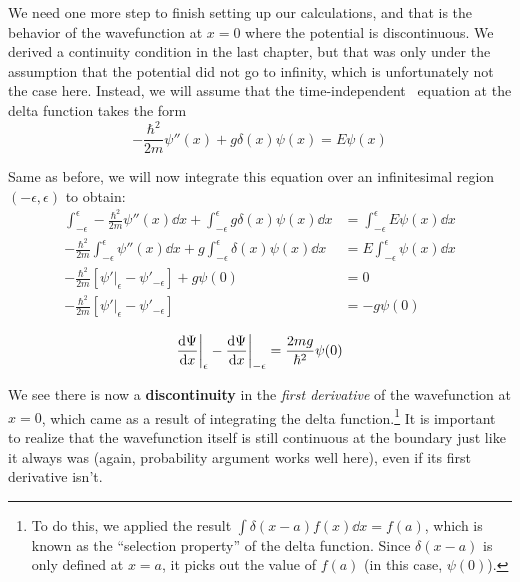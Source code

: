 We need one more step to finish setting up our calculations, and that is the behavior of the wavefunction at $x=0$ where the potential is discontinuous. We derived a continuity condition in the last chapter, but that was only under the assumption that the potential did not go to infinity, which is unfortunately not the case here. Instead, we will assume that the time-independent \Sch\ equation at the delta function takes the form 
\begin{equation*}
	-\frac{\hbar^2}{2m} \psi''(x) + g\delta(x) \psi(x) = E\psi(x)
\end{equation*}

Same as before, we will now integrate this equation over an infinitesimal region $(-\epsilon,\epsilon)$ to obtain:
\begin{align*}
	\int_{-\epsilon}^{\epsilon} -\frac{\hbar^2}{2m}  \psi''(x) \dd{x} + \int_{-\epsilon}^{\epsilon} g\delta(x) \psi(x) \dd{x} &= \int_{-\epsilon}^{\epsilon} E\psi(x) \dd{x} \\
	-\frac{\hbar^2}{2m} \int_{-\epsilon}^{\epsilon} \psi''(x) \dd{x} + g \int_{-\epsilon}^{\epsilon} \delta(x) \psi(x) \dd{x} &= E \int_{-\epsilon}^{\epsilon} \psi(x) \dd{x} \\
	-\frac{\hbar^2}{2m} \left[ \psi'|_{\epsilon} - \psi'_{-\epsilon} \right] + g \psi(0) &= 0 \\
	-\frac{\hbar^2}{2m} \left[ \psi'|_{\epsilon} - \psi'_{-\epsilon} \right] &= -g \psi(0)
\end{align*}

\begin{tcolorbox}[title = Continuity across the delta function potential] \vspace{-2ex}
	\begin{equation}
	\dv{\Psi}{x} \bigg|_{\epsilon} - \dv{\Psi}{x} \bigg|_{-\epsilon} = \frac{2mg}{\hbar^2}\psi(0) \label{eq:kp-cont}
	\end{equation}
\end{tcolorbox}

We see there is now a \textbf{discontinuity} in the \emph{first derivative} of the wavefunction at $x=0$, which came as a result of integrating the delta function.\footnote{To do this, we applied the result $\int\delta(x-a)f(x) \dd{x} = f(a)$, which is known as the ``selection property'' of the delta function. Since $\delta(x-a)$ is only defined at $x=a$, it picks out the value of $f(a)$ (in this case, $\psi(0)$).} It is important to realize that the wavefunction itself is still continuous at the boundary just like it always was (again, probability argument works well here), even if its first derivative isn't. \par 

